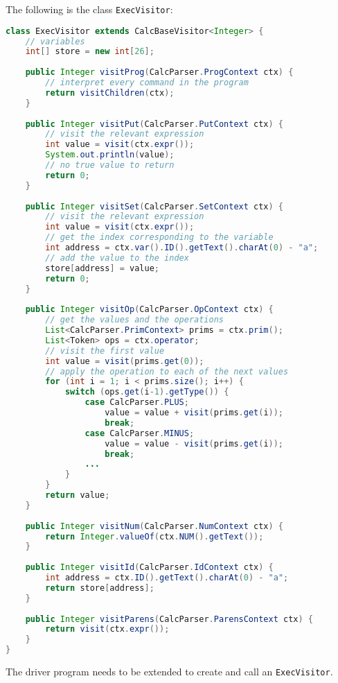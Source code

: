 \documentclass[a4paper, openany]{memoir}
\begin{document}
The following is the class \texttt{ExecVisitor}:
\begin{lstlisting}[language=java]
class ExecVisitor extends CalcBaseVisitor<Integer> {
    // variables
    int[] store = new int[26];
    
    public Integer visitProg(CalcParser.ProgContext ctx) {
        // interpret every command in the program
        return visitChildren(ctx);
    }
    
    public Integer visitPut(CalcParser.PutContext ctx) {
        // visit the relevant expression
        int value = visit(ctx.expr());
        System.out.println(value);
        // no true value to return
        return 0;
    }
    
    public Integer visitSet(CalcParser.SetContext ctx) {
        // visit the relevant expression
        int value = visit(ctx.expr());
        // get the index corresponding to the variable
        int address = ctx.var().ID().getText().charAt(0) - "a";
        // add the value to the index
        store[address] = value;
        return 0;
    }
    
    public Integer visitOp(CalcParser.OpContext ctx) {
        // get the values and the operations
        List<CalcParser.PrimContext> prims = ctx.prim();
        List<Token> ops = ctx.operator;
        // visit the first value
        int value = visit(prims.get(0));
        // apply the operation to each of the next values
        for (int i = 1; i < prims.size(); i++) {
            switch (ops.get(i-1).getType()) {
                case CalcParser.PLUS;
                    value = value + visit(prims.get(i));
                    break;
                case CalcParser.MINUS;
                    value = value - visit(prims.get(i));
                    break;
                ...
            }
        }
        return value;
    }
    
    public Integer visitNum(CalcParser.NumContext ctx) {
        return Integer.valueOf(ctx.NUM().getText());
    }
    
    public Integer visitId(CalcParser.IdContext ctx) {
        int address = ctx.ID().getText().charAt(0) - "a";
        return store[address];
    }
    
    public Integer visitParens(CalcParser.ParensContext ctx) {
        return visit(ctx.expr());
    }
}
\end{lstlisting}

The driver program needs to be extended to create and call an \texttt{ExecVisitor}.
\end{document}
